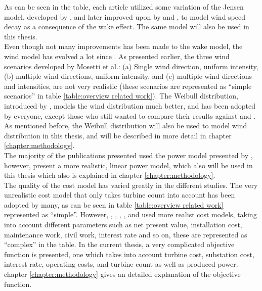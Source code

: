 \noindent As can be seen in the table, each article utilized some variation of the Jensen model, developed by \cite{Jensen}, and later improved upon by \cite{Katic} and \cite{Frandsen}, to model wind speed decay as a consequence of the wake effect. The same model will also be used in this thesis. \\

\noindent Even though not many improvements has been made to the wake model, the wind model has evolved a lot since \cite{Mosetti}. As presented earlier, the three wind scenarios developed by Mosetti et al.: (a) Single wind direction, uniform intensity, (b) multiple wind directions, uniform intensity, and (c) multiple wind directions and intensities, are not very realistic (these scenarios are represented as ``simple scenarios'' in table \ref{table:overview related work}). The Weibull distribution, introduced by \cite{Mora}, models the wind distribution much better, and has been adopted by everyone, except those who still wanted to compare their results against \cite{Mosetti} and \cite{Grady}. As mentioned before, the Weibull distribution will also be used to model wind distribution in this thesis, and will be described in more detail in chapter \ref{chapter:methodology}. \\

\noindent The majority of the publications presented used the power model presented by \cite{Mosetti}, however, \cite{Kusiak} present a more realistic, linear power model, which also will be used in this thesis which also is explained in chapter \ref{chapter:methodology}.\\ 

\noindent The quality of the cost model has varied greatly in the different studies. The very unrealistic cost model that only takes turbine count into account has been adopted by many, as can be seen in table \ref{table:overview related work} represented as ``simple''. However, \citep{Mora}, \citep{Gonzalez}, \citep{Sisbot}, \citep{Saavedra-Morena}, and \citep{Chen} used more realist cost models, taking into account different parameters such as net present value, installation cost, maintenance work, civil work, interest rate and so on, these are represented as ``complex'' in the table. In the current thesis, a very complicated objective function is presented, one which takes into account turbine cost, substation cost, interest rate, operating costs, and turbine count as well as produced power. chapter \ref{chapter:methodology} gives an detailed explanation of the objective function. \\

